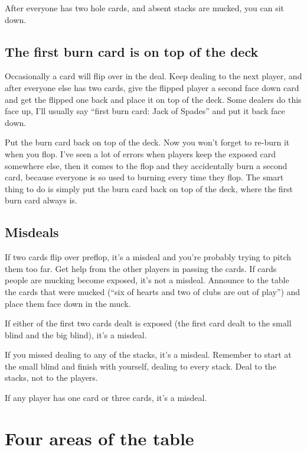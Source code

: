 
After everyone has two hole cards, and absent stacks are mucked, you can
sit down.

\subsection*{The first burn card is on top of the deck}

Occasionally a card will flip over in the deal. Keep dealing to the
next player, and after everyone else has two cards, give the flipped player
a second face down card and get the flipped one back and place it on
top of the deck. Some dealers do this face up, I'll usually say
``first burn card: Jack of Spades'' and put it back face down.

Put the burn card back on top of the deck. Now you won't forget
to re-burn it when you flop. I've seen a lot of errors when players
keep the exposed card somewhere else, then it comes to the flop and
they accidentally burn a second card, because everyone is so used
to burning every time they flop. The smart thing to do is simply
put the burn card back on top of the deck,
where the first burn card always is.

\subsection*{Misdeals}

If two cards flip over preflop, it's a misdeal and you're probably
trying to pitch them too far. Get help from the other players in
passing the cards. If cards people are mucking become exposed, it's
not a misdeal. Announce to the table the cards that were mucked
(``six of hearts and two of clubs are out of play'') and place
them face down in the muck.

If either of the first two cards dealt is exposed (the first card dealt to
the small blind and the big blind), it's a misdeal.

If you missed dealing to any of the stacks, it's a misdeal.
Remember to start at the small blind and finish with yourself, dealing
to every stack. Deal to the stacks, not to the players.

If any player has one card or three cards, it's a misdeal.

\section{Four areas of the table}

